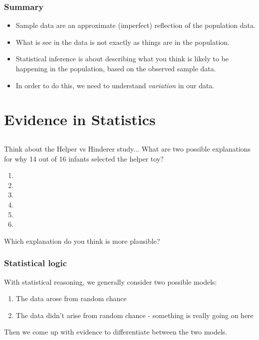 \begin{frame}
\frametitle{Summary}
\begin{itemize}
    \item
    Sample data are an approximate (imperfect) reflection of the population data.
    \item
    What is see in the data is not exactly as things are in the population.
    \item
    Statistical inference is about describing what you think is likely to be happening in the population, based on the observed sample data.
    \item
    In order to do this, we need to understand \emph{variation} in our data.
\end{itemize}
\end{frame}

\section[Evidence]{Evidence in Statistics}
\subsection{}
\begin{frame}
\end{frame}


\begin{frame}
\frametitle{\grp}
Think about the Helper vs Hinderer study...  What are two possible explanations for why 14 out of 16 infants selected the helper toy?
\begin{enumerate}
    \item
    \item[]
    \item[]
    \item
    \item[]
    \item[]
\end{enumerate}
Which explanation do you think is more plausible?
\end{frame}

\begin{frame}
\frametitle{Statistical logic}
With statistical reasoning, we generally consider two possible models:
\begin{enumerate}
    \item
    The data arose from random chance
    \item
    The data didn't arise from random chance - something is really going on here
\end{enumerate}
Then we come up with evidence to differentiate between the two models.
\end{frame}

